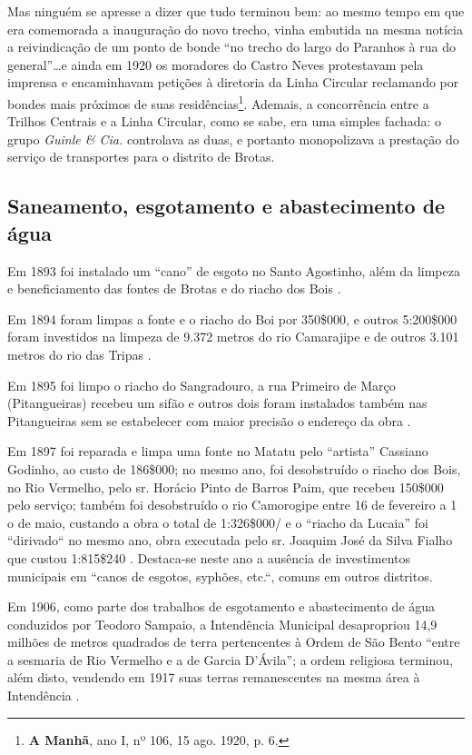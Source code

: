 Mas ninguém se apresse a dizer que tudo terminou bem: ao mesmo tempo em que era comemorada a inauguração do novo trecho, vinha embutida na mesma notícia a reivindicação de um ponto de bonde ``no trecho do largo do Paranhos à rua do general''\dots e ainda em 1920 os moradores do Castro Neves protestavam pela imprensa e encaminhavam petições à diretoria da Linha Circular reclamando por bondes mais próximos de suas residências\footnote{\textbf{A Manhã}, ano I, nº 106, 15 ago. 1920, p. 6.}. Ademais, a concorrência entre a Trilhos Centrais e a Linha Circular, como se sabe, era uma simples fachada: o grupo \textit{Guinle \& Cia.} controlava as duas, e portanto monopolizava a prestação do serviço de transportes para o distrito de Brotas.

\subsection{Saneamento, esgotamento e abastecimento de água}

Em 1893 foi instalado um “cano” de esgoto no Santo Agostinho, além da limpeza e beneficiamento das fontes de Brotas e do riacho dos Bois \cite[pp.~6-7]{salvador_relatorio_1893}.

Em 1894 foram limpas a fonte e o riacho do Boi por 350\$000, e outros 5:200\$000 foram investidos na limpeza de 9.372 metros do rio Camarajipe e de outros 3.101 metros do rio das Tripas \cite[p.~156]{salvador_relatorio_1894}.

Em 1895 foi limpo o riacho do Sangradouro, a rua Primeiro de Março (Pitangueiras) recebeu um sifão e outros dois foram instalados também nas Pitangueiras sem se estabelecer com maior precisão o endereço da obra \cite[pp.~20, 137-138]{salvador_relatorio_1895}. 

Em 1897 foi reparada e limpa uma fonte no Matatu pelo “artista” Cassiano Godinho, ao custo de 186\$000; no mesmo ano, foi desobstruído o riacho dos Bois, no Rio Vermelho, pelo sr. Horácio Pinto de Barros Paim, que recebeu 150\$000 pelo serviço; também foi desobstruído o rio Camorogipe entre 16 de fevereiro a 1 o de maio, custando a obra o total de 1:326\$000/ e o “riacho da Lucaia” foi “dirivado“ no mesmo ano, obra executada pelo sr. Joaquim José da Silva Fialho que custou 1:815\$240 \cite[p.~99-100]{salvador_relatorio_1897}. Destaca-se neste ano a ausência de investimentos municipais em “canos de esgotos, syphões, etc.“, comuns em outros distritos.


Em 1906, como parte dos trabalhos de esgotamento e abastecimento de água conduzidos por Teodoro Sampaio, a Intendência Municipal desapropriou 14,9 milhões de metros quadrados de terra pertencentes à Ordem de São Bento ``entre a sesmaria de Rio Vermelho e a de Garcia D'Ávila''; a ordem religiosa terminou, além disto, vendendo em 1917 suas terras remanescentes na mesma área à Intendência \cite[p.~306]{VASCONCELOS2002}.

